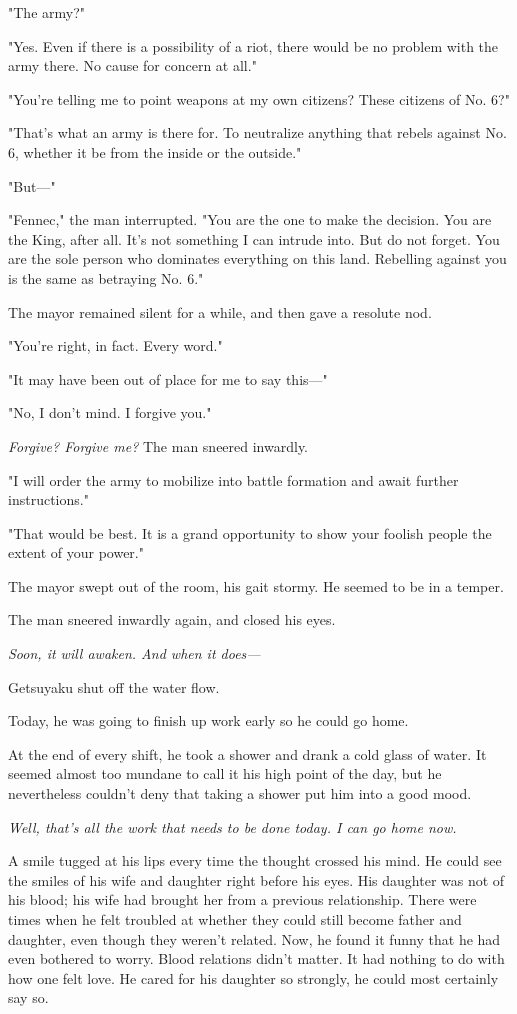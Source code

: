 "The army?"

"Yes. Even if there is a possibility of a riot, there would be no
problem with the army there. No cause for concern at all."

"You're telling me to point weapons at my own citizens? These citizens
of No. 6?"

"That's what an army is there for. To neutralize anything that rebels
against No. 6, whether it be from the inside or the outside."

"But---"

"Fennec," the man interrupted. "You are the one to make the decision.
You are the King, after all. It's not something I can intrude into. But
do not forget. You are the sole person who dominates everything on this
land. Rebelling against you is the same as betraying No. 6."

The mayor remained silent for a while, and then gave a resolute nod.

"You're right, in fact. Every word."

"It may have been out of place for me to say this---"

"No, I don't mind. I forgive you."

\emph{Forgive? Forgive me?} The man sneered inwardly.

"I will order the army to mobilize into battle formation and await
further instructions."

"That would be best. It is a grand opportunity to show your foolish
people the extent of your power."

The mayor swept out of the room, his gait stormy. He seemed to be in a
temper.

The man sneered inwardly again, and closed his eyes.

\emph{Soon, it will awaken. And when it does---}

\myspace

Getsuyaku shut off the water flow.

Today, he was going to finish up work early so he could go home.

At the end of every shift, he took a shower and drank a cold glass of
water. It seemed almost too mundane to call it his high point of the
day, but he nevertheless couldn't deny that taking a shower put him into
a good mood.

\emph{Well, that's all the work that needs to be done today. I can go home
now.}

A smile tugged at his lips every time the thought crossed his mind. He
could see the smiles of his wife and daughter right before his eyes. His
daughter was not of his blood; his wife had brought her from a previous
relationship. There were times when he felt troubled at whether they
could still become father and daughter, even though they weren't
related. Now, he found it funny that he had even bothered to worry.
Blood relations didn't matter. It had nothing to do with how one felt
love. He cared for his daughter so strongly, he could most certainly say
so.

